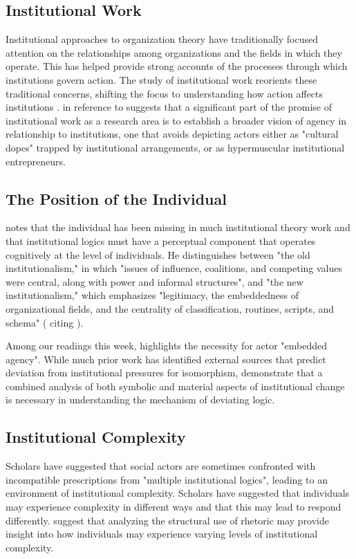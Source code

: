 \documentclass[12pt]{article}
\begin{document}
\subsection{Institutional Work}
Institutional approaches to organization theory have traditionally focused attention on the relationships among organizations and the  fields in which they operate. This has helped provide strong accounts of the processes through which institutions govern action. The study of institutional work reorients these traditional concerns, shifting the focus to understanding how action affects institutions \citep{Lawrence2009}. \cite{Lawrence2009} in reference to \cite{Suddaby2010} suggests that a significant part of the promise of institutional work as a research area is to establish a broader vision of agency in relationship to institutions, one that avoids depicting actors either as "cultural dopes" trapped by institutional arrangements, or as hypermuscular institutional entrepreneurs. 

\subsection{The Position of the Individual}
\cite{Suddaby2010} notes that the individual has been missing in much institutional theory work and that institutional logics must have a perceptual component that operates cognitively at the level of individuals. He distinguishes between "the old institutionalism," in which "issues of influence, coalitions, and competing values were central, along with power and informal structures", and "the new institutionalism," which emphasizes "legitimacy, the embeddedness of organizational fields, and the centrality of classification, routines, scripts, and schema" (\cite{Philips2009} citing \cite{Greenwood1996}). 

Among our readings this week, \cite{Zietsma2010} highlights the necessity for actor "embedded agency". While much prior work has identified external sources that predict deviation from institutional pressures for isomorphism, \cite{Lepoutre2012} demonstrate that a combined analysis of both symbolic and material aspects of institutional change is necessary in understanding the mechanism of deviating logic.

\subsection{Institutional Complexity}
Scholars have suggested that social actors are sometimes confronted with incompatible prescriptions from "multiple institutional logics", leading to an environment of institutional complexity. Scholars have suggested that individuals may experience complexity in different ways and that this may lead to respond differently. \cite{Harmon2015} suggest that analyzing the structural use of rhetoric may provide insight into how individuals may experience varying levels of institutional complexity.
\end{document}
